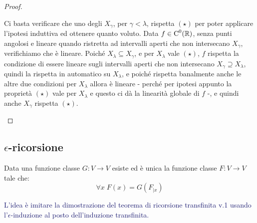 \begin{proof}
\begin{itemize}
		Ci basta verificare che uno degli $X_\gamma$, per $\gamma < \lambda$, rispetta $(\star)$ per poter applicare l'ipotesi induttiva ed ottenere quanto voluto. Data $f \in \text C^0(\mathbb R)$, senza punti angolosi e lineare quando ristretta ad intervalli aperti che non intersecano 
		$X_\gamma$, verifichiamo che è lineare. Poiché $X_\lambda \subseteq X_\gamma$, e per $X_\lambda$ vale $(\star)$, $f$ rispetta la condizione di essere lineare sugli intervalli aperti che non intersecano $X_\gamma \supseteq X_\lambda$,
		quindi la rispetta in automatico su $X_\lambda$, e poiché rispetta banalmente anche le altre due condizioni per $X_\lambda$ allora è lineare - perché per ipotesi appunto la proprietà $(\star)$ vale per $X_\lambda$ e questo ci dà la linearità globale di $f$ -,
		e quindi anche $X_\gamma$ rispetta $(\star)$.
	\end{itemize}
\end{proof}


\pagebreak
\subsection{\texorpdfstring{$\epsilon$-ricorsione}{epsilon-ricorsione}}
\begin{theorem}
	Data una funzione classe $G : V \to V$ esiste ed è unica la funzione classe $F : V \to V$ tale che:
	\[ \forall x \; F(x) = G(F_{|x})
		\]
\end{theorem}

\textcolor{MidnightBlue}{L'idea è imitare la dimostrazione del teorema di ricorsione transfinita v.1 usando l'$\epsilon$-induzione al posto dell'induzione transfinita.}

